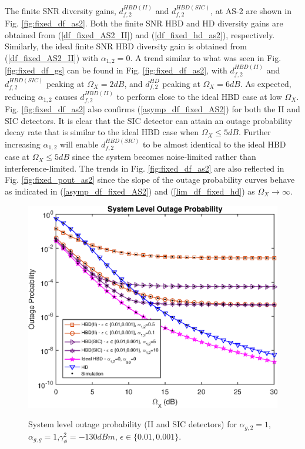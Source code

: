 The finite SNR diversity gains, $d_{f,2}^{HBD(II)}$ and $d_{f,2}^{HBD(SIC)}$, at AS-2 are shown in Fig. \ref{fig:fixed_df_as2}. Both the finite SNR HBD and HD diversity gains are obtained from (\ref{df_fixed_AS2_II}) and (\ref{df_fixed_hd_as2}), respectively. Similarly, the ideal finite SNR HBD diversity gain is obtained from (\ref{df_fixed_AS2_II}) with $\alpha_{1,2}=0$. A trend similar to what was seen in Fig. \ref{fig:fixed_df_gs} can be found in Fig. \ref{fig:fixed_df_as2}, with $d_{f,2}^{HBD(II)}$ and $d_{f,2}^{HBD(SIC)}$ peaking at $\Omega_X=2dB$, and $d_{f,2}^{HD}$ peaking at $\Omega_X=6dB$. As expected, reducing $\alpha_{1,2}$ causes $d_{f,2}^{HBD(II)}$ to perform close to the ideal HBD case at low $\Omega_X$. Fig. \ref{fig:fixed_df_as2} also confirms (\ref{asymp_df_fixed_AS2}) for both the II and SIC detectors. It is clear that the SIC detector can attain an outage probability decay rate that is similar to the ideal HBD case when $\Omega_X\leq5dB$. Further increasing $\alpha_{1,2}$ will enable $d_{f,2}^{HBD(SIC)}$ to be almost identical to the ideal HBD case at $\Omega_X\leq5dB$ since the system becomes noise-limited rather than interference-limited. The trends in Fig. \ref{fig:fixed_df_as2} are also reflected in Fig. \ref{fig:fixed_pout_as2} since the slope of the outage probability curves behave as indicated in (\ref{asymp_df_fixed_AS2}) and (\ref{lim_df_fixed_hd}) as $\Omega_X \to \infty$.

\begin{figure}[]
\centering
\includegraphics [width=0.6\columnwidth]{chap4_fig/fixed_pout_sys.eps}
\label{fig:fixed_pout_sys}
\caption{System level outage probability (II and SIC detectors) for $\alpha_{g,2}=1$,$\alpha_{g,g}=1$,$\gamma_{\phi}^2=-130dBm$, $\epsilon\in\{0.01, 0.001\}$.}
\end{figure}

